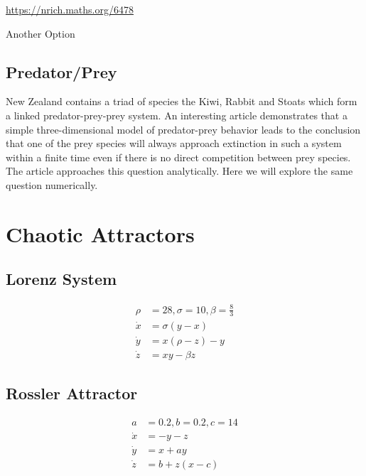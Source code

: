 \documentclass[letterpaper,10pt]{book}
\begin{document}
      \url{https://nrich.maths.org/6478}
      
      Another Option\cite{nelson1986pendulum}

      
    \section{Predator/Prey}
      New Zealand contains a triad of species the Kiwi, Rabbit and Stoats which form a linked predator-prey-prey system.  An interesting article \cite{korobeinikov1999global} demonstrates that a simple three-dimensional model of predator-prey behavior leads to the conclusion that one of the prey species will always approach extinction in such a system within a finite time even if there is no direct competition between prey species.  The article approaches this question analytically.  Here we will explore the same question numerically.
      
  \chapter{Chaotic Attractors}
    \section{Lorenz System}
    
      \begin{equation}
	\begin{aligned}
	  \rho{} &= 28, \sigma{} = 10, \beta{} = \frac{8}{3}\\
	  \dot{x} &= \sigma{}(y - x)\\
	  \dot{y} &= x(\rho{} - z) -y\\
	  \dot{z} &= xy - \beta{}z
	\end{aligned}
      \end{equation}


    \section{Rossler Attractor}
    
      \begin{equation}
	\begin{aligned}
	  a &= 0.2, b = 0.2, c = 14\\
	  \dot{x} &= -y - z\\
	  \dot{y} &= x + ay\\
	  \dot{z} &= b + z(x-c)
	\end{aligned}
      \end{equation}
\end{document}
